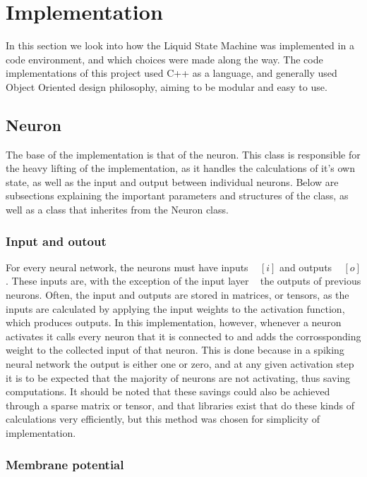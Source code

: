 \chapter{Implementation}

In this section we look into how the Liquid State Machine was implemented in a code environment, and which choices were made along the way.
The code implementations of this project used C++ as a language, and generally used Object Oriented design philosophy, aiming to be modular and easy to use.

\section{Neuron}

The base of the implementation is that of the neuron. This class is responsible for the heavy lifting of the implementation, as it handles the calculations of it's own state, as well as the input and output between individual neurons. Below are subsections explaining the important parameters and structures of the class, as well as a class that inherites from the Neuron class.

\subsection{Input and outout}

For every neural network, the neurons must have inputs ~ $[i]$ and outputs ~ $[o]$. These inputs are, with the exception of the input layer ~ the outputs of previous neurons. Often, the input and outputs are stored in matrices, or tensors, as the inputs are calculated by applying the input weights to the activation function, which produces outputs. In this implementation, however, whenever a neuron activates it calls every neuron that it is connected to and adds the corrossponding weight to the collected input of that neuron. This is done because in a spiking neural network the output is either one or zero, and at any given activation step it is to be expected that the majority of neurons are not activating, thus saving computations. It should be noted that these savings could also be achieved through a sparse matrix or tensor, and that libraries exist that do these kinds of calculations very efficiently, but this method was chosen for simplicity of implementation.

\subsection{Membrane potential}

